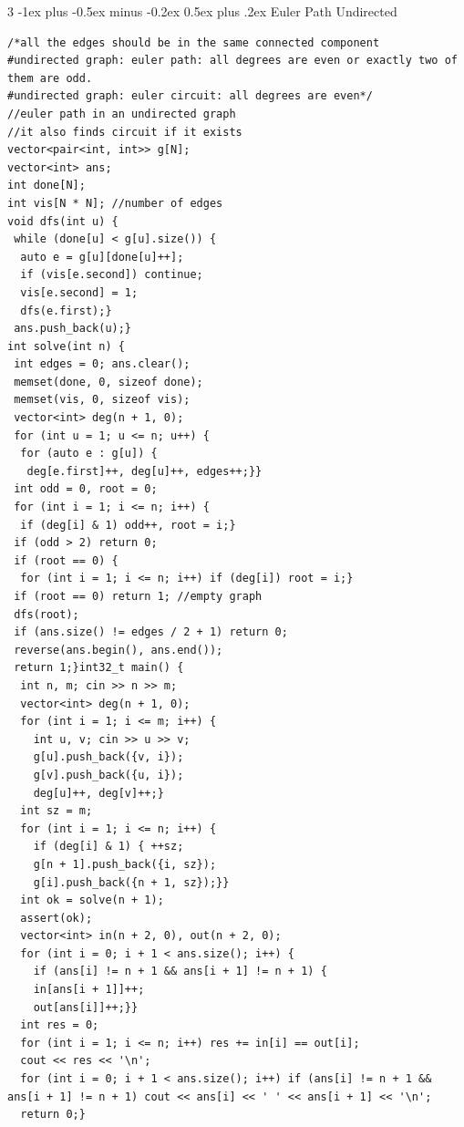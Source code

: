\documentclass[8pt,a4paper,onesided]{article}
\makeatletter
\renewcommand{\subsection}{\@startsection{subsection}{2}{0mm}
    {-1ex plus -0.5ex minus -0.2ex} %
    {0.5ex plus .2ex}                %
    {\normalfont\large\bfseries}}    %
\makeatother
\begin{document}
\begin{multicols}{3}
\subsection{Euler Path Undirected}
\begin{verbatim}
/*all the edges should be in the same connected component
#undirected graph: euler path: all degrees are even or exactly two of them are odd.
#undirected graph: euler circuit: all degrees are even*/
//euler path in an undirected graph
//it also finds circuit if it exists
vector<pair<int, int>> g[N];
vector<int> ans;
int done[N];
int vis[N * N]; //number of edges
void dfs(int u) {
 while (done[u] < g[u].size()) {
  auto e = g[u][done[u]++];
  if (vis[e.second]) continue;
  vis[e.second] = 1;
  dfs(e.first);}
 ans.push_back(u);}
int solve(int n) {
 int edges = 0; ans.clear();
 memset(done, 0, sizeof done);
 memset(vis, 0, sizeof vis);
 vector<int> deg(n + 1, 0);
 for (int u = 1; u <= n; u++) {
  for (auto e : g[u]) {
   deg[e.first]++, deg[u]++, edges++;}}
 int odd = 0, root = 0;
 for (int i = 1; i <= n; i++) {
  if (deg[i] & 1) odd++, root = i;}
 if (odd > 2) return 0;
 if (root == 0) {
  for (int i = 1; i <= n; i++) if (deg[i]) root = i;}
 if (root == 0) return 1; //empty graph
 dfs(root);
 if (ans.size() != edges / 2 + 1) return 0;
 reverse(ans.begin(), ans.end());
 return 1;}int32_t main() {
  int n, m; cin >> n >> m;
  vector<int> deg(n + 1, 0);
  for (int i = 1; i <= m; i++) {
    int u, v; cin >> u >> v;
    g[u].push_back({v, i});
    g[v].push_back({u, i});
    deg[u]++, deg[v]++;}
  int sz = m;
  for (int i = 1; i <= n; i++) {
    if (deg[i] & 1) { ++sz;
    g[n + 1].push_back({i, sz});
    g[i].push_back({n + 1, sz});}}
  int ok = solve(n + 1);
  assert(ok);
  vector<int> in(n + 2, 0), out(n + 2, 0);
  for (int i = 0; i + 1 < ans.size(); i++) {
    if (ans[i] != n + 1 && ans[i + 1] != n + 1) {
    in[ans[i + 1]]++;
    out[ans[i]]++;}}
  int res = 0;
  for (int i = 1; i <= n; i++) res += in[i] == out[i];
  cout << res << '\n';
  for (int i = 0; i + 1 < ans.size(); i++) if (ans[i] != n + 1 && ans[i + 1] != n + 1) cout << ans[i] << ' ' << ans[i + 1] << '\n';
  return 0;}
\end{verbatim}

\end{multicols}
\end{document}
